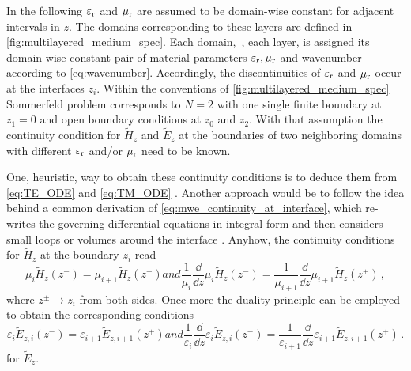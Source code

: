 In the following $\varepsilon_{\mathrm{r}}$ and $\mu_{\mathrm{r}}$ are assumed to be domain-wise constant for
adjacent intervals in $z$.
The domains corresponding to these layers are defined in
\cref{fig:multilayered_medium_spec}.
Each domain,~\ie, each layer, is assigned its domain-wise constant pair of
material parameters $\varepsilon_{\mathrm{r}},\mu_{\mathrm{r}}$ and wavenumber according to
\eqref{eq:wavenumber}.
Accordingly, the discontinuities of $\varepsilon_{\mathrm{r}}$ and $\mu_{\mathrm{r}}$ occur at the interfaces
$z_i$.
Within the conventions of \cref{fig:multilayered_medium_spec} Sommerfeld problem
corresponds to $N=2$ with one single finite boundary at $z_1 = 0$ and open
boundary conditions at $z_0$ and $z_2$.
With that assumption the continuity condition for $\tilde{H}_z$ and
$\tilde{E}_z$ at the boundaries of two neighboring domains with different
$\varepsilon_{\mathrm{r}}$ and/or $\mu_{\mathrm{r}}$ need to be known.

One, heuristic, way to obtain these continuity conditions is to deduce them from 
\eqref{eq:TE_ODE} and \eqref{eq:TM_ODE} \cite[47]{Chew1999}.
Another approach would be to follow the idea behind a common derivation of
\eqref{eq:mwe_continuity_at_interface}, which re-writes the governing 
differential equations in integral form and then considers small loops or
volumes around the interface \cite[p20]{Jackson2013}.
Anyhow, the continuity conditions for $\tilde{H}_z$ at the boundary $z_i$ read
\begin{subequations}
	\begin{equation}\label{eq:B_continuity}
		\mu_i \tilde{H}_{z} \left(z^{-}\right) =
		\mu_{i+1} \tilde{H}_{z} \left(z^{+}\right)
	\end{equation}
	and
	\begin{equation}\label{eq:H_z_tilde_second_continuity_condition}
		\frac{1}{\mu_i}
		\frac{\dd}{\dd z}
		\mu_i \tilde{H}_{z}\left(z^{-}\right)
		=
		\frac{1}{\mu_{i+1}}
		\frac{\dd}{\dd z}
		\mu_{i+1} \tilde{H}_{z} \left(z^{+}\right)
		\,,
	\end{equation}
\end{subequations}
where $z^{\pm} \to z_i$ from both sides.
Once more the duality principle can be employed to obtain the corresponding
conditions 
\begin{subequations}
	\begin{equation}\label{eq:D_continuity}
		\varepsilon_i \tilde{E}_{z,i} \left(z^{-}\right)
		=
		\varepsilon_{i+1} \tilde{E}_{z,i+1} \left(z^{+}\right)
	\end{equation}
	and
	\begin{equation}\label{eq:E_z_tilde_second_continuity_condition}
		\frac{1}{\varepsilon_i}
		\frac{\dd}{\dd z}
		\varepsilon_i \tilde{E}_{z,i} \left(z^{-}\right)
		=
		\frac{1}{\varepsilon_{i+1}}
		\frac{\dd}{\dd z}
		\varepsilon_{i+1} \tilde{E}_{z,i+1} \left(z^{+}\right)
		\,.
	\end{equation}
\end{subequations}
for $\tilde{E}_z$.










